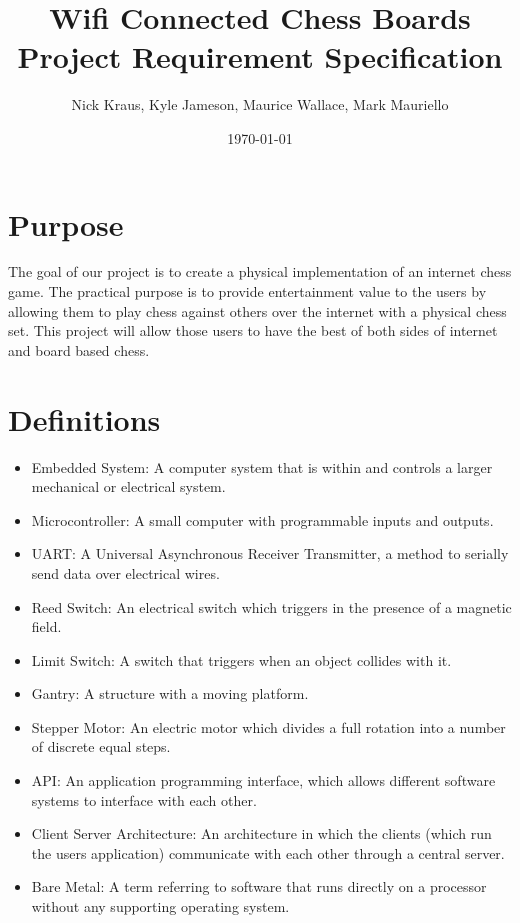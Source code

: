 \documentclass{article}
\title{Wifi Connected Chess Boards \\ \large Project Requirement Specification}
\author{Nick Kraus, Kyle Jameson, Maurice Wallace, Mark Mauriello}
\date{\today}
\begin{document}
\maketitle


\section*{Purpose}
\indent

The goal of our project is to create a physical implementation of an internet chess game. The practical purpose is to provide entertainment value to the users by allowing them to play chess against others over the internet with a physical chess set. This project will allow those users to have the best of both sides of internet and board based chess.

\section*{Definitions}
\indent

\begin{itemize}
	
	\item Embedded System: A computer system that is within and controls a larger mechanical or electrical system.
	\item Microcontroller: A small computer with programmable inputs and outputs.
	\item UART: A Universal Asynchronous Receiver Transmitter, a method to serially send data over electrical wires.
	\item Reed Switch: An electrical switch which triggers in the presence of a magnetic field.
	\item Limit Switch: A switch that triggers when an object collides with it.
	\item Gantry: A structure with a moving platform.
	\item Stepper Motor: An electric motor which divides a full rotation into a number of discrete equal steps.
	\item API: An application programming interface, which allows different software systems to interface with each other.
	\item Client Server Architecture: An architecture in which the clients (which run the users application) communicate with each other through a central server.
	\item Bare Metal: A term referring to software that runs directly on a processor without any supporting operating system.

\end{itemize}
\end{document}
